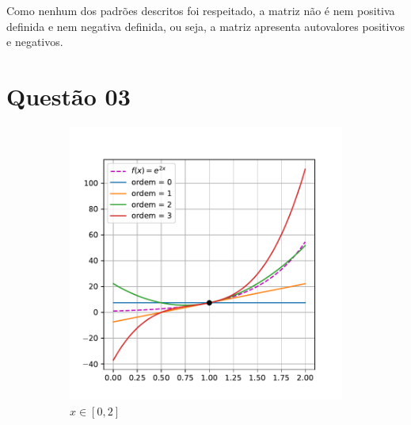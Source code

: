 \documentclass[10pt, a4paper]{article}
\begin{document}
Como nenhum dos padrões descritos foi respeitado, a matriz não é nem positiva definida e nem negativa definida, 
ou seja, a matriz apresenta autovalores positivos e negativos.

\section[q03]{Questão 03}

\begin{figure}
    \centering
    \begin{subfigure}[b]{0.45\textwidth}
        \centering
        \includegraphics[width=\textwidth]{images/q3_plot.pdf}
        \caption{$x \in [0, 2]$}
        \label{fig:q3_1}
    \end{subfigure}
    \hfill
    \begin{subfigure}[b]{0.45\textwidth}
        \centering

\end{subfigure}
\end{figure}
\end{document}
